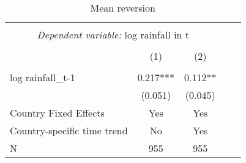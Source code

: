 \documentclass{article}
\begin{document}
\begin{table}
\caption{Mean reversion}
\begin{center}
\begin{tabular}{lcccc}
\hline \\[-1.8ex]
                       \multicolumn{3}{c}{\textit{Dependent variable:} log rainfall in t} \\
\hline \\[-1.8ex]
                      &     (1)     &     (2)      \\
\hline \\[-1.8ex]
\midrule

log rainfall_{t-1}        & 0.217***  & 0.112**     \\
                      & (0.051)   & (0.045)     \\

Country Fixed Effects & Yes         & Yes      \\
Country-specific 
time trend            & No         & Yes      \\
N                     & 955        & 955        \\

\hline
\end{tabular}
\end{center}
\end{table}
\end{document}
